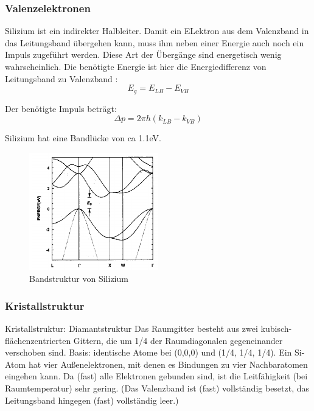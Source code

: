 		
	\subsubsection{Valenzelektronen}
		Silizium ist ein indirekter Halbleiter. Damit ein ELektron aus dem Valenzband in das Leitungsband übergehen kann, muss ihm neben einer Energie auch noch ein Impuls zugeführt werden. Diese Art der Übergänge sind energetisch wenig wahrscheinlich.
		Die benötigte Energie ist hier die Energiedifferenz von Leitungsband zu Valenzband :
		\begin{equation*}
		E_g = E_{LB} - E_{VB}
		\end{equation*}
		
		Der benötigte Impuls beträgt:
		\begin{equation*}
			\Delta p = 2\pi h(k_{LB}-k_{VB})
		\end{equation*}
		
		Silizium hat eine Bandlücke von ca 1.1eV.
		
		\newpage
		\begin{figure}[ht]
			\centering
			\includegraphics[width=0.5\textwidth]{Kapitel/Kap02/bandstruktur_SI.PNG}
			\caption{Bandstruktur von Silizium}
			\label{02_BS_SI}
		\end{figure}
		
	
	\subsubsection{Kristallstruktur}
		
		Kristallstruktur: Diamantstruktur
		Das Raumgitter besteht aus zwei kubisch-flächenzentrierten Gittern, die um 1/4 der Raumdiagonalen gegeneinander verschoben sind.
		Basis: identische Atome bei (0,0,0) und (1/4, 1/4, 1/4).
		Ein Si-Atom hat vier Außenelektronen, mit denen es Bindungen zu vier Nachbaratomen eingehen kann. Da (fast) alle Elektronen gebunden sind, ist die Leitfähigkeit (bei Raumtemperatur) sehr gering. (Das Valenzband ist (fast) vollständig besetzt, das Leitungsband hingegen (fast) vollständig leer.)
		
